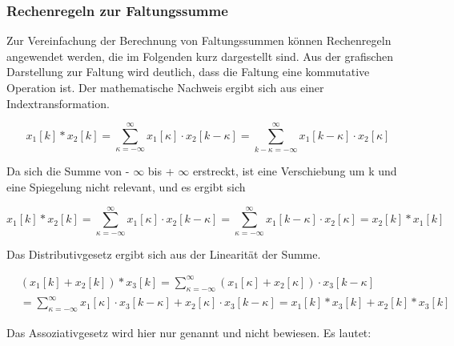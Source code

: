 \subsubsection{Rechenregeln zur Faltungssumme}

\noindent Zur Vereinfachung der Berechnung von Faltungssummen k\"{o}nnen Rechenregeln angewendet werden, die im Folgenden kurz dargestellt sind. Aus der grafischen Darstellung zur Faltung wird deutlich, dass die Faltung eine kommutative Operation ist. Der mathematische Nachweis ergibt sich aus einer Indextransformation. 

\begin{equation}\label{eq:fourninetytwo}
x_{1} \left[k\right]*x_{2} \left[k\right]=\sum _{\kappa =-\infty }^{\infty }x_{1} \left[\kappa \right]\cdot x_{2} \left[k-\kappa \right] =\sum _{k-\kappa =-\infty }^{\infty }x_{1} \left[k-\kappa \right]\cdot x_{2} \left[\kappa \right] 
\end{equation}

\noindent Da sich die Summe von - $\infty$ bis + $\infty$ erstreckt, ist eine Verschiebung um k und eine Spiegelung nicht relevant, und es ergibt sich

\begin{equation}\label{eq:fourninetythree}
x_{1} \left[k\right]*x_{2} \left[k\right]=\sum _{\kappa =-\infty }^{\infty }x_{1} \left[\kappa \right]\cdot x_{2} \left[k-\kappa \right] =\sum _{\kappa =-\infty }^{\infty }x_{1} \left[k-\kappa \right]\cdot x_{2} \left[\kappa \right] =x_{2} \left[k\right]*x_{1} \left[k\right]
\end{equation}

\noindent Das Distributivgesetz ergibt sich aus der Linearit\"{a}t der Summe.

\begin{equation}\label{eq:fourninetyfour}
\begin{split}
& \left(x_{1} \left[k\right]+x_{2} \left[k\right]\right)*x_{3} \left[k\right]=\sum _{\kappa =-\infty }^{\infty }\left(x_{1} \left[\kappa \right]+x_{2} \left[\kappa \right]\right)\cdot x_{3} \left[k-\kappa \right] \\ 
& =\sum _{\kappa =-\infty }^{\infty }x_{1} \left[\kappa \right]\cdot x_{3} \left[k-\kappa \right] +x_{2} \left[\kappa \right]\cdot x_{3} \left[k-\kappa \right]=x_{1} \left[k\right]*x_{3} \left[k\right]+x_{2} \left[k\right]*x_{3} \left[k\right]
\end{split}
\end{equation}

\noindent Das Assoziativgesetz wird hier nur genannt und nicht bewiesen. Es lautet:

